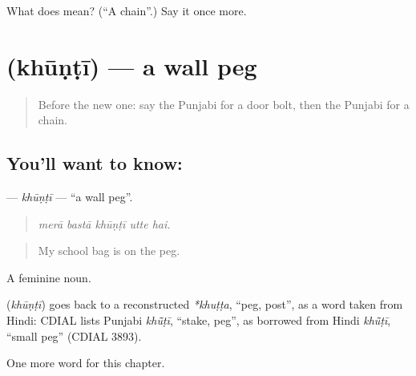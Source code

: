 \begin{tcolorbox}[breakable,colback=teal!4,colframe=teal!35!black,title={Before you move on}]
What does  mean? (\textquotedblleft{}A chain\textquotedblright{}.) Say it once more.
\end{tcolorbox}
\section[\texorpdfstring{\pa{ਖੂੰਟੀ} (khūṇṭī)}{ਖੂੰਟੀ (khūṇṭī)}]{ (khūṇṭī) — a wall peg}

\label{lesson:PA-C248-khunti}



\begin{quote}
Before the new one: say the Punjabi for a door bolt, then the Punjabi for a chain.
\end{quote}

\subsection*{You'll want to know: }
\textbf{} — \emph{khūṇṭī} — \textquotedblleft{}a wall peg\textquotedblright{}.

\begin{quote}
    
\end{quote}

\begin{quote}
\emph{merā bastā khūṇṭī utte hai.}
\end{quote}

\begin{quote}
My school bag is on the peg.
\end{quote}

A feminine noun.

\begin{cousinweb}
\textbf{} (\emph{khūṇṭī}) goes back to a reconstructed \emph{*khuṭṭa}, \textquotedblleft{}peg, post\textquotedblright{}, as a word taken from Hindi: CDIAL lists Punjabi \emph{khū̃ṭī}, \textquotedblleft{}stake, peg\textquotedblright{}, as borrowed from Hindi \emph{khū̃ṭī}, \textquotedblleft{}small peg\textquotedblright{} (CDIAL 3893).
\end{cousinweb}

\begin{grammarlens}[title={What you've built}]
One more word for this chapter.
\end{grammarlens}

